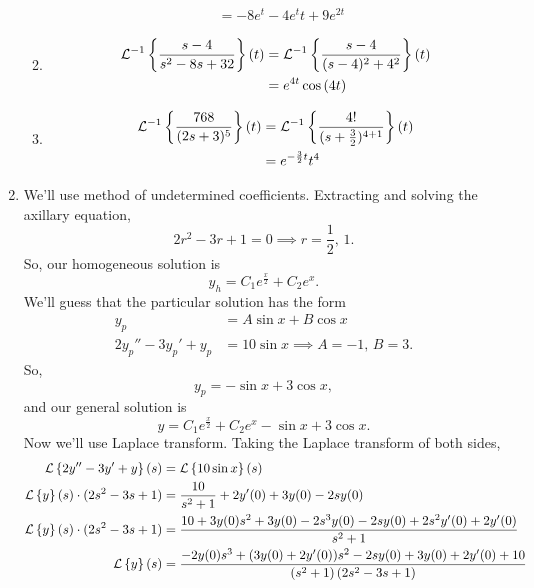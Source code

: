 \begin{enumerate}[label=\arabic*.]
\begin{enumerate}[label=(\alph*)]
\begin{align*}
					&= -8e^{t} - 4e^{t}t + 9e^{2t}
				\end{align*}
			\item
				\begin{align*}
					\mathcal{L}^{-1}\left\{ \frac{s-4}{s^2-8s+32} \right\}\left(t\right) &= \mathcal{L}^{-1}\left\{ \frac{s-4}{(s-4)^2 + 4^2} \right\}\left(t\right) \\
					&= e^{4t}\cos{(4t)}
				\end{align*}
			\item
				\begin{align*}
					\mathcal{L}^{-1}\left\{ \frac{768}{(2s+3)^5} \right\}\left(t\right) &= \mathcal{L}^{-1}\left\{ \frac{4!}{(s+\frac{3}{2})^{4+1}} \right\}\left(t\right) \\
					&= e^{-\frac{3}{2}t}t^4
				\end{align*}
		\end{enumerate}
	\item
		We'll use method of undetermined coefficients.
		Extracting and solving the axillary equation,
		\begin{equation*}
			2r^2 - 3r + 1 = 0 \implies r = \frac{1}{2} \text{, } 1.
		\end{equation*}
		So, our homogeneous solution is
		\begin{equation*}
			y_h = C_1e^{\frac{x}{2}} + C_2e^{x}.
		\end{equation*}
		We'll guess that the particular solution has the form
		\begin{align*}
			y_p &= A\sin{x} + B\cos{x} \\
			2y_p'' - 3y_p' + y_p &= 10\sin{x} \implies A = -1 \text{, } B = 3.
		\end{align*}
		So,
		\begin{equation*}
			y_p = -\sin{x} + 3\cos{x},
		\end{equation*}
		and our general solution is
		\begin{equation*}
			y = C_1e^{\frac{x}{2}} + C_2e^{x} -\sin{x} + 3\cos{x}.
		\end{equation*}
		Now we'll use Laplace transform. Taking the Laplace transform of both sides,
		\begin{align*}
			\Laplace{2y'' - 3y' + y} &= \Laplace{10\sin{x}} \\
			\Laplace{y} \cdot (2s^2 - 3s + 1) &= \frac{10}{s^2+1} + 2y'(0) + 3y(0) -2sy(0) \\
			\Laplace{y} \cdot (2s^2 - 3s + 1) &= \frac{10 + 3y(0)s^2 + 3y(0) - 2s^3y(0) - 2sy(0) + 2s^2y'(0) + 2y'(0)}{s^2+1} \\
			\Laplace{y} &= \frac{-2y(0)s^3 + (3y(0)+2y'(0))s^2 -2sy(0) + 3y(0) + 2y'(0) + 10}{\left(s^2+1\right)\left(2s^2-3s+1\right)} \\

\end{align*}
\end{enumerate}
